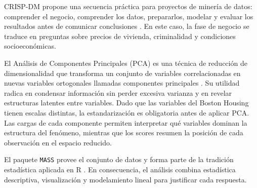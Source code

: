 CRISP-DM propone una secuencia pr\'actica para proyectos de miner\'ia de datos: comprender el negocio, comprender los datos, prepararlos, modelar y evaluar los resultados antes de comunicar conclusiones . En este caso, la fase de negocio se traduce en preguntas sobre precios de vivienda, criminalidad y condiciones socioecon\'omicas.

El An\'alisis de Componentes Principales (PCA) es una t\'ecnica de reducci\'on de dimensionalidad que transforma un conjunto de variables correlacionadas en nuevas variables ortogonales llamadas componentes principales . Su utilidad radica en condensar informaci\'on sin perder excesiva varianza y en revelar estructuras latentes entre variables. Dado que las variables del Boston Housing tienen escalas distintas, la estandarizaci\'on es obligatoria antes de aplicar PCA. Las cargas de cada componente permiten interpretar qu\'e variables dominan la estructura del fen\'omeno, mientras que los scores resumen la posici\'on de cada observaci\'on en el espacio reducido.

El paquete \texttt{MASS} provee el conjunto de datos y forma parte de la tradici\'on estad\'istica aplicada en R . En consecuencia, el an\'alisis combina estad\'istica descriptiva, visualizaci\'on y modelamiento lineal para justificar cada respuesta.